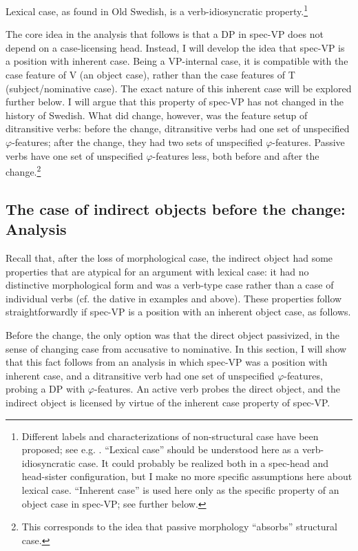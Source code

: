 \documentclass[output=paper]{langscibook}
\begin{document}
Lexical case, as found in Old Swedish, is a verb-idiosyncratic property.\footnote{Different labels and characterizations of non-structural case have been proposed; see e.g. \citet[181–182]{Thrainsson2001}. “Lexical case” should be understood here as a verb-idiosyncratic case. It could probably be realized both in a spec-head and head-sister configuration, but I make no more specific assumptions here about lexical case.  “Inherent case” is used here only as the specific property of an object case in spec-VP; see further below.} 



The core idea in the analysis that follows is that a DP in spec-VP does not depend on a case-licensing head. Instead, I will develop the idea that spec-VP is a position with inherent case. Being a VP-internal case, it is compatible with the case feature of V (an object case), rather than the case features of T (subject/nominative case). The exact nature of this inherent case will be explored further below. I will argue that this property of spec-VP has not changed in the history of Swedish. What did change, however, was the feature setup of ditransitive verbs: before the change, ditransitive verbs had one set of unspecified $\varphi ${}-features; after the change, they had two sets of unspecified $\varphi $-features. Passive verbs have one set of unspecified $\varphi ${}-features less, both before and after the change.\footnote{This corresponds to the idea that passive morphology “absorbs” structural case.}


\subsection{The case of indirect objects before the change: Analysis}\label{sec:falk:4.2}


Recall that, after the loss of morphological case, the indirect object had some properties that are atypical for an argument with lexical case: it had no distinctive morphological form and was a verb-type case rather than a case of individual verbs (cf. the dative in examples  and  above). These properties follow straightforwardly if spec-VP is a position with an inherent object case, as follows.


Before the change, the only option was that the direct object passivized, in the sense of changing case from accusative to nominative. In this section, I will show that this fact follows from an analysis in which spec-VP was a position with inherent case, and a ditransitive verb had one set of unspecified $\varphi ${}-features, probing a DP with $\varphi $-features. An active verb probes the direct object, and the indirect object is licensed by virtue of the inherent case property of spec-VP. 
\end{document}
